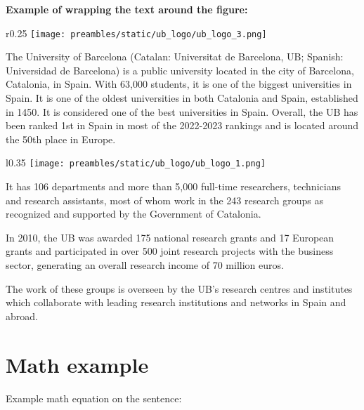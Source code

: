 \textbf{Example of wrapping the text around the figure:}\\

\begin{wrapfigure}{r}{0.25\textwidth} %
    \centering
    \texttt{[image: preambles/static/ub\_logo/ub\_logo\_3.png]}
\end{wrapfigure}
The University of Barcelona (Catalan: Universitat de Barcelona, UB; Spanish: Universidad de Barcelona) is a public university located in the city of Barcelona, Catalonia, in Spain. With 63,000 students, it is one of the biggest universities in Spain. It is one of the oldest universities in both Catalonia and Spain, established in 1450.
It is considered one of the best universities in Spain. Overall, the UB has been ranked 1st in Spain in most of the 2022-2023 rankings and is located around the 50th place in Europe. 


\begin{wrapfigure}{l}{0.35\textwidth}
    \centering
    \texttt{[image: preambles/static/ub\_logo/ub\_logo\_1.png]}
\end{wrapfigure}
It has 106 departments and more than 5,000 full-time researchers, technicians and research assistants, most of whom work in the 243 research groups as recognized and supported by the Government of Catalonia. 

In 2010, the UB was awarded 175 national research grants and 17 European grants and participated in over 500 joint research projects with the business sector, generating an overall research income of 70 million euros. 

The work of these groups is overseen by the UB's research centres and institutes which collaborate with leading research institutions and networks in Spain and abroad. 

\let\clearpage\relax        %
\listoffigures

\newpage




\newpage



\section{Math example}


Example math equation on the sentence:

